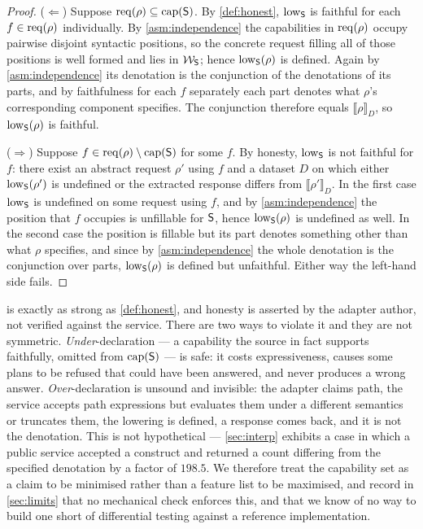 \begin{proof}
($\Leftarrow$) Suppose $\mathrm{req}(\rho) \subseteq \mathrm{cap}(\mathsf{S})$. By
\cref{def:honest}, $\mathrm{low}_{\mathsf{S}}$ is faithful for each $f \in \mathrm{req}(\rho)$
individually. By \cref{asm:independence} the capabilities in $\mathrm{req}(\rho)$
occupy pairwise disjoint syntactic positions, so the concrete request filling
all of those positions is well formed and lies in $\mathcal{W}_{\mathsf{S}}$; hence
$\mathrm{low}_{\mathsf{S}}(\rho)$ is defined. Again by \cref{asm:independence} its denotation
is the conjunction of the denotations of its parts, and by faithfulness for
each $f$ separately each part denotes what $\rho$'s corresponding component
specifies. The conjunction therefore equals $\llbracket \rho \rrbracket_D$, so
$\mathrm{low}_{\mathsf{S}}(\rho)$ is faithful.

($\Rightarrow$) Suppose $f \in \mathrm{req}(\rho) \setminus \mathrm{cap}(\mathsf{S})$ for some $f$.
By honesty, $\mathrm{low}_{\mathsf{S}}$ is not faithful for $f$: there exist an abstract
request $\rho'$ using $f$ and a dataset $D$ on which either $\mathrm{low}_{\mathsf{S}}(\rho')$
is undefined or the extracted response differs from
$\llbracket \rho' \rrbracket_D$. In the first case $\mathrm{low}_{\mathsf{S}}$ is undefined on
some request using $f$, and by \cref{asm:independence} the position that $f$
occupies is unfillable for $\mathsf{S}$, hence $\mathrm{low}_{\mathsf{S}}(\rho)$ is undefined as
well. In the second case the position is fillable but its part denotes
something other than what $\rho$ specifies, and since by
\cref{asm:independence} the whole denotation is the conjunction over parts,
$\mathrm{low}_{\mathsf{S}}(\rho)$ is defined but unfaithful. Either way the left-hand side
fails.
\end{proof}

\begin{remark}
\label{rem:honesty-assumption}
 is exactly as strong as \cref{def:honest}, and honesty is
asserted by the adapter author, not verified against the service. There are two
ways to violate it and they are not symmetric. \emph{Under}-declaration --- a
capability the source in fact supports faithfully, omitted from $\mathrm{cap}(\mathsf{S})$ ---
is safe: it costs expressiveness, causes some plans to be refused that could
have been answered, and never produces a wrong answer. \emph{Over}-declaration
is unsound and invisible: the adapter claims \textsf{path}, the service accepts
path expressions but evaluates them under a different semantics or truncates
them, the lowering is defined, a response comes back, and it is not the
denotation. This is not hypothetical --- \cref{sec:interp} exhibits a case in
which a public service accepted a construct and returned a count differing from
the specified denotation by a factor of $198.5$. We therefore treat the
capability set as a claim to be minimised rather than a feature list to be
maximised, and record in \cref{sec:limits} that no mechanical check enforces
this, and that we know of no way to build one short of differential testing
against a reference implementation.
\end{remark}

